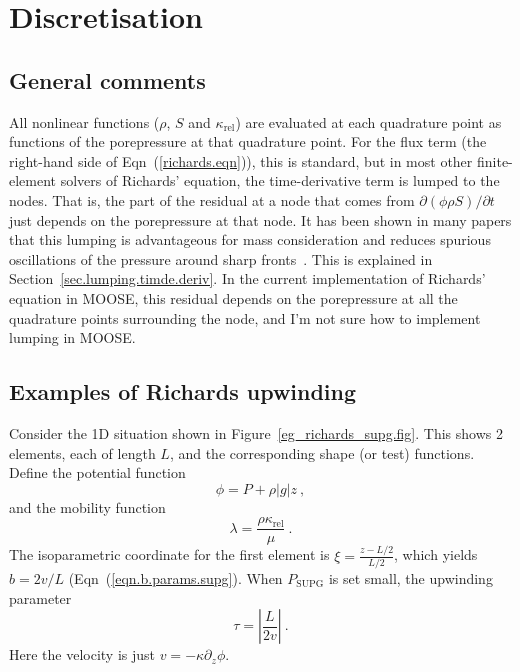 \documentclass[]{scrreprt}
\begin{document}
\chapter{Discretisation}
\label{discret.chap}

\section{General comments}

All nonlinear functions ($\rho$, $S$ and $\kappa_{\mathrm{rel}}$) are
evaluated at each quadrature point as functions of the porepressure at
that quadrature point.  For the flux term (the right-hand side of
Eqn~(\ref{richards.eqn})), this is standard, but in most other
finite-element solvers of Richards' equation, the time-derivative term
is lumped to the nodes.  That is, the part of the residual at a node
that comes from $\partial(\phi\rho S)/\partial t$ just depends on the
porepressure at that node.  It has been shown in many papers that this
lumping is advantageous for mass consideration and reduces spurious
oscillations of the pressure around sharp fronts~\cite{celiaET1990}.
This is explained in Section~\ref{sec.lumping.timde.deriv}.  In the
current implementation of Richards' equation in MOOSE, this residual
depends on the porepressure at all the quadrature points surrounding
the node, and I'm not sure how to implement lumping in MOOSE.



\section{Examples of Richards upwinding}

Consider the 1D situation shown in Figure~\ref{eg_richards_supg.fig}.
This shows 2 elements, each of length $L$, and the corresponding shape
(or test) functions.  Define the potential function
\begin{equation}
\phi = P + \rho|g|z \ ,
\end{equation}
and the mobility function
\begin{equation}
\lambda = \frac{\rho \kappa_{\mathrm{rel}}}{\mu} \ .
\end{equation}
The isoparametric coordinate for the first element is $\xi =
\frac{z-L/2}{L/2}$, which yields $b=2v/L$
(Eqn~(\ref{eqn.b.params.supg}).  When $P_{\mathrm{SUPG}}$ is set
small, the upwinding parameter 
\begin{equation}
\tau = \left|\frac{L}{2v}\right| \ .
\end{equation}
Here the velocity is just $v = -\kappa \partial_{z}\phi$.
\end{document}
